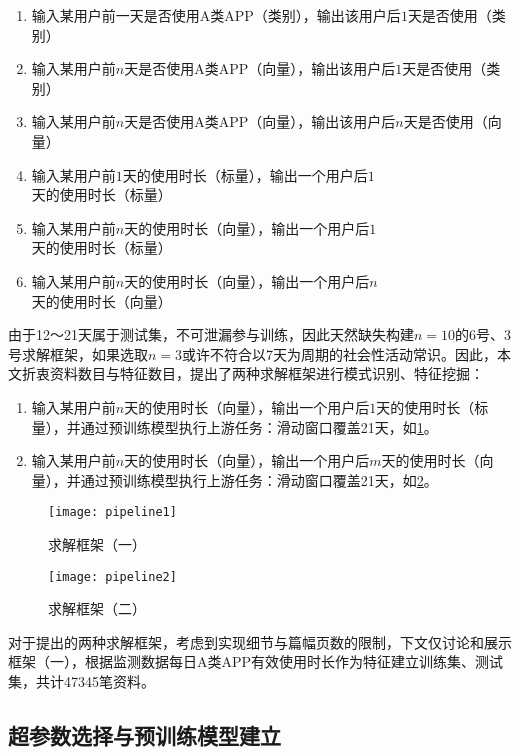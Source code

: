 \documentclass[withoutpreface,bwprint]{cumcmthesis}
\begin{document}
\begin{enumerate}
    \item 输入某用户前一天是否使用A类APP（类别），输出该用户后$1$天是否使用（类别）
    \item 输入某用户前$n$天是否使用A类APP（向量），输出该用户后$1$天是否使用（类别）
    \item 输入某用户前$n$天是否使用A类APP（向量），输出该用户后$n$天是否使用（向量）
    \item 输入某用户前$1$天的使用时长（标量），输出一个用户后$1$天的使用时长（标量）
    \item 输入某用户前$n$天的使用时长（向量），输出一个用户后$1$天的使用时长（标量）
    \item 输入某用户前$n$天的使用时长（向量），输出一个用户后$n$天的使用时长（向量）
\end{enumerate}

由于12～21天属于测试集，不可泄漏参与训练，因此天然缺失构建$n=10$的6号、3号求解框架，如果选取$n=3$或许不符合以7天为周期的社会性活动常识。因此，本文折衷资料数目与特征数目，提出了两种求解框架进行模式识别、特征挖掘：
\begin{enumerate}
    \item 输入某用户前$n$天的使用时长（向量），输出一个用户后$1$天的使用时长（标量），并通过预训练模型执行上游任务：滑动窗口覆盖21天，如\cref{fig:pipeline1}。
    \item 输入某用户前$n$天的使用时长（向量），输出一个用户后$m$天的使用时长（向量），并通过预训练模型执行上游任务：滑动窗口覆盖21天，如\cref{fig:pipeline2}。
\end{enumerate}

\begin{figure}[!htbp]
    \centering
    \texttt{[image: pipeline1]}
    \caption{求解框架（一）}
    \label{fig:pipeline1}
\end{figure}

\begin{figure}[!htbp]
    \centering
    \texttt{[image: pipeline2]}
    \caption{求解框架（二）}
    \label{fig:pipeline2}
\end{figure}

对于提出的两种求解框架，考虑到实现细节与篇幅页数的限制，下文仅讨论和展示框架（一），根据监测数据每日A类APP有效使用时长作为特征建立训练集、测试集，共计47345笔资料。

\subsection{超参数选择与预训练模型建立}
\end{document}
